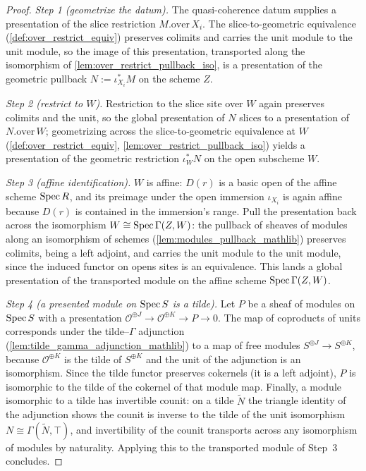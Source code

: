 \begin{proof}
  \leanok
  \emph{Step 1 (geometrize the datum).} The quasi-coherence datum supplies a presentation
  of the slice restriction \(M.\mathrm{over}\,X_i\). The slice-to-geometric equivalence
  (\cref{def:over_restrict_equiv}) preserves colimits and carries the unit module to the
  unit module, so the image of this presentation, transported along the isomorphism of
  \cref{lem:over_restrict_pullback_iso}, is a presentation of the geometric pullback
  \(N := \iota_{X_i}^{*} M\) on the scheme \(Z\).

  \emph{Step 2 (restrict to \(W\)).} Restriction to the slice site over \(W\) again
  preserves colimits and the unit, so the global presentation of \(N\) slices to a
  presentation of \(N.\mathrm{over}\,W\); geometrizing across the slice-to-geometric
  equivalence at \(W\) (\cref{def:over_restrict_equiv},
  \cref{lem:over_restrict_pullback_iso}) yields a presentation of the geometric
  restriction \(\iota_W^{*} N\) on the open subscheme \(W\).

  \emph{Step 3 (affine identification).} \(W\) is affine: \(D(r)\) is a basic open of the
  affine scheme \(\operatorname{Spec} R\), and its preimage under the open immersion \(\iota_{X_i}\) is
  again affine because \(D(r)\) is contained in the immersion's range. Pull the
  presentation back across the isomorphism \(W \cong \operatorname{Spec}\Gamma(Z, W)\): the pullback of
  sheaves of modules along an isomorphism of schemes
  (\cref{lem:modules_pullback_mathlib}) preserves colimits, being a left adjoint, and
  carries the unit module to the unit module, since the induced functor on opens sites is
  an equivalence. This lands a global presentation of the transported module on the
  affine scheme \(\operatorname{Spec}\Gamma(Z, W)\).

  \emph{Step 4 (a presented module on \(\operatorname{Spec} S\) is a tilde).} Let \(P\) be a sheaf of
  modules on \(\operatorname{Spec} S\) with a presentation
  \(\mathcal{O}^{\oplus J} \to \mathcal{O}^{\oplus K} \to P \to 0\). The map of coproducts
  of units corresponds under the tilde--\(\Gamma\) adjunction
  (\cref{lem:tilde_gamma_adjunction_mathlib}) to a map of free modules
  \(S^{\oplus J} \to S^{\oplus K}\), because \(\mathcal{O}^{\oplus K}\) is the tilde of
  \(S^{\oplus K}\) and the unit of the adjunction is an isomorphism. Since the tilde
  functor preserves cokernels (it is a left adjoint), \(P\) is isomorphic to the tilde of
  the cokernel of that module map. Finally, a module isomorphic to a tilde has invertible
  counit: on a tilde \(\widetilde{N}\) the triangle identity of the adjunction shows the
  counit is inverse to the tilde of the unit isomorphism \(N \cong
  \Gamma(\widetilde{N}, \top)\), and invertibility of the counit transports across any
  isomorphism of modules by naturality. Applying this to the transported module of
  Step~3 concludes.
\end{proof}

